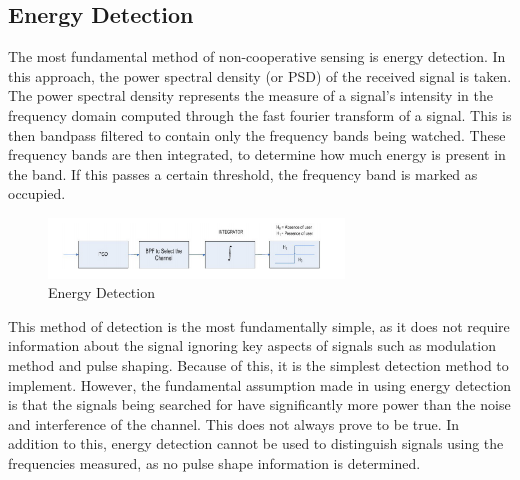 \subsection{Energy Detection}
The most fundamental method of non-cooperative sensing is energy detection. In this approach, the power spectral density (or PSD) of the received signal is taken. The power spectral density represents the measure of a signal’s intensity in the frequency domain computed through the fast fourier transform of a signal. This is then bandpass filtered to contain only the frequency bands being watched. These frequency bands are then integrated, to determine how much energy is present in the band. If this passes a certain threshold, the frequency band is marked as occupied.
\begin{figure}[ht]
\centering
\includegraphics[width=0.70\textwidth]{img/energy_detection.png}
\caption{Energy Detection}
\label{fig:energy_detection}
\end{figure}\par
This method of detection is the most fundamentally simple, as it does not require information about the signal ignoring key aspects of signals such as modulation method and pulse shaping. Because of this, it is the simplest detection method to implement. However, the fundamental assumption made in using energy detection is that the signals being searched for have significantly more power than the noise and interference of the channel. This does not always prove to be true. In addition to this, energy detection cannot be used to distinguish signals using the frequencies measured, as no pulse shape information is determined.

